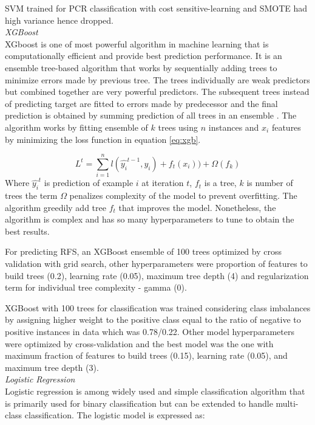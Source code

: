 \documentclass{article}
\begin{document}
SVM trained for PCR classification with cost sensitive-learning and SMOTE had high variance hence dropped.\\


\noindent\textit{XGBoost}\\
XGboost is one of most powerful algorithm in machine learning that is computationally efficient and provide best prediction performance. It is an ensemble tree-based algorithm that works by sequentially adding trees to minimize errors made by previous tree. The trees individually are weak predictors but combined together are very powerful predictors. The subsequent trees instead of predicting target are fitted to errors made by predecessor and the final prediction is obtained by summing prediction of all trees in an ensemble \cite{Chen_2016}. The algorithm works by fitting ensemble of $k$ trees using $n$ instances and $x_i$ features by minimizing the loss function in equation \ref{eq:xgb}. 


\begin{equation}
	\label{eq:xgb}
	L^t = \sum_{i=1}^{n}l(\hat{y_i}^{t-1},y_i)+f_t(x_i))+\Omega(f_k)
\end{equation}
Where $\hat{y_i}^t$ is prediction of example $i$ at iteration $t$, $f_t$ is a tree, $k$ is number of trees the term $\Omega$ penalizes complexity of the model to prevent overfitting. The algorithm greedily add tree $f_t$ that improves the model. Nonetheless, the algorithm is complex and has so many hyperparameters to tune to obtain the best results.

For predicting RFS, an XGBoost ensemble of 100 trees optimized by cross validation with grid search, other hyperparameters were proportion of features to build trees (0.2), learning rate (0.05), maximum tree depth (4) and regularization term for individual tree complexity - gamma (0).

XGBoost with 100 trees for classification was trained considering class imbalances by assigning higher weight to the positive class equal to the ratio of negative  to positive instances in data which was 0.78/0.22. Other model hyperparameters were optimized by cross-validation and the best model was the one with maximum fraction of features to build trees (0.15), learning rate (0.05), and maximum tree depth (3). \\

\noindent\textit{Logistic Regression}\\
Logistic regression is among widely used and simple classification algorithm that is primarily used for binary classification but can be extended to handle multi-class classification. The logistic model is expressed as:
\end{document}
